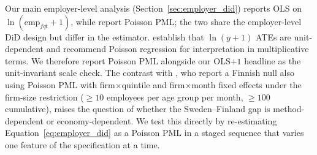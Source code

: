 \documentclass[preprint,12pt,authoryear]{elsarticle}
\begin{document}
Our main employer-level analysis (Section~\ref{sec:employer_did}) reports OLS on $\ln(\text{emp}_{fqt}+1)$, while \citet{brynjolfsson2025canaries} report Poisson PML; the two share the employer-level DiD design but differ in the estimator. \citet{chen2024logs} establish that $\ln(y+1)$ ATEs are unit-dependent and recommend Poisson regression for interpretation in multiplicative terms. We therefore report Poisson PML alongside our OLS$+1$ headline as the unit-invariant scale check. The contrast with \citet{kauhanen2026youth}, who report a Finnish null also using Poisson PML with firm$\times$quintile and firm$\times$month fixed effects under the \citet{brynjolfsson2025canaries} firm-size restriction ($\geq 10$ employees per age group per month, $\geq 100$ cumulative), raises the question of whether the Sweden--Finland gap is method-dependent or economy-dependent. We test this directly by re-estimating Equation~\ref{eq:employer_did} as a Poisson PML in a staged sequence that varies one feature of the specification at a time.
\end{document}

